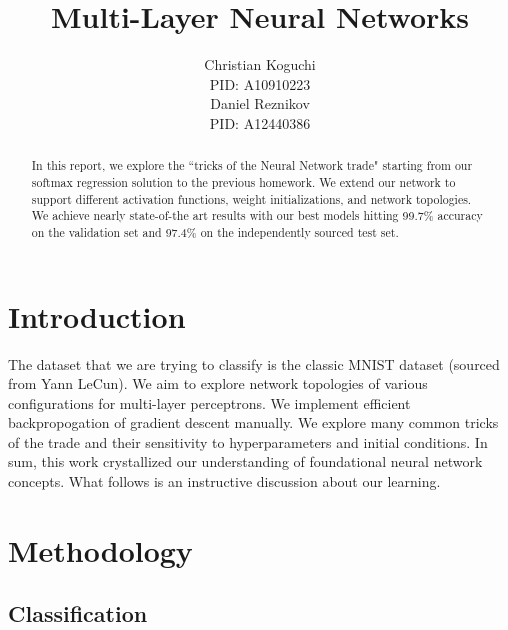 \documentclass{article} %
\title{Multi-Layer Neural Networks}
\author{
Christian Koguchi \\
PID: A10910223 \\
\And
Daniel Reznikov \\
PID: A12440386 \\
}
\begin{document}
\maketitle

\begin{abstract}
In this report, we explore the ``tricks of the Neural Network trade" starting from our softmax regression solution to the previous homework.  We extend our network to support different activation functions, weight initializations, and network topologies.  We achieve nearly state-of-the art results with our best models hitting 99.7\% accuracy on the validation set and 97.4\% on the independently sourced test set.   
\end{abstract}


\section*{Introduction}
The dataset that we are trying to classify is the classic MNIST dataset (sourced from Yann LeCun)\cite{LeCun}.  We aim to explore network topologies of various configurations for multi-layer perceptrons.  We implement efficient backpropogation of gradient descent manually.  We explore many common tricks of the trade and their sensitivity to hyperparameters and initial conditions.  In sum, this work crystallized our understanding of foundational neural network concepts.  What follows is an instructive discussion about our learning.  


\section*{Methodology}
\subsection*{Classification}
\end{document}

